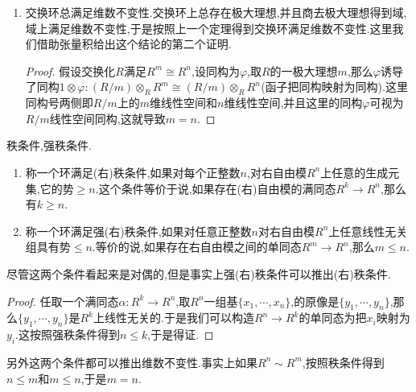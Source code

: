 \begin{enumerate}
\begin{proof}
		如果$R$不满足维数不变性,即存在正整数$m\not=n$,使得存在两个矩阵$A:m\times n$和$B:n\times m$,有$AB=E_m,BA=E_n$.将$f$作用到这个矩阵等式中,得到$S$不满足维数不变性.
	\end{proof}
	\item 交换环总满足维数不变性.交换环上总存在极大理想,并且商去极大理想得到域,域上满足维数不变性,于是按照上一个定理得到交换环满足维数不变性.这里我们借助张量积给出这个结论的第二个证明.
	\begin{proof}
		
		假设交换化$R$满足$R^m\cong R^n$,设同构为$\varphi$,取$R$的一极大理想$m$,那么$\varphi$诱导了同构$1\otimes\varphi:(R/m)\otimes_RR^m\cong(R/m)\otimes_RR^n$(函子把同构映射为同构).这里同构号两侧即$R/m$上的$m$维线性空间和$n$维线性空间,并且这里的同构$\varphi$可视为$R/m$线性空间同构,这就导致$m=n$.
	\end{proof}
\end{enumerate}

秩条件,强秩条件.
\begin{enumerate}
	\item 称一个环满足(右)秩条件,如果对每个正整数$n$,对右自由模$R^n$上任意的生成元集,它的势$\ge n$.这个条件等价于说,如果存在(右)自由模的满同态$R^k\to R^n$,那么有$k\ge n$.
	\item 称一个环满足强(右)秩条件,如果对任意正整数$n$对右自由模$R^n$上任意线性无关组具有势$\le n$.等价的说,如果存在右自由模之间的单同态$R^m\to R^n$,那么$m\le n$.
\end{enumerate}

尽管这两个条件看起来是对偶的,但是事实上强(右)秩条件可以推出(右)秩条件.
\begin{proof}
	
	任取一个满同态$\alpha:R^k\to R^n$,取$R^n$一组基$\{x_1,\cdots,x_n\}$,的原像是$\{y_1,\cdots,y_n\}$,那么$\{y_1,\cdots,y_n\}$是$R^k$上线性无关的.于是我们可以构造$R^n\to R^k$的单同态为把$x_i$映射为$y_i$.这按照强秩条件得到$n\le k$,于是得证.
\end{proof}

另外这两个条件都可以推出维数不变性.事实上如果$R^n\sim R^m$,按照秩条件得到$n\le m$和$m\le n$,于是$m=n$.


